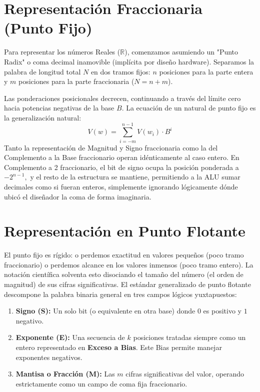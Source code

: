 \section{Representación Fraccionaria (Punto Fijo)}

Para representar los números Reales ($\mathbb{R}$), comenzamos asumiendo un "Punto Radix" o coma decimal inamovible (implícita por diseño hardware). 
Separamos la palabra de longitud total $N$ en dos tramos fijos: $n$ posiciones para la parte entera y $m$ posiciones para la parte fraccionaria ($N = n + m$).

Las ponderaciones posicionales decrecen, continuando a través del límite cero hacia potencias negativas de la base $B.$ 
La ecuación de un natural de punto fijo es la generalización natural:
\[ V(w) = \sum_{i=-m}^{n-1} V(w_i) \cdot B^i \]
Tanto la representación de Magnitud y Signo fraccionaria como la del Complemento a la Base fraccionario operan idénticamente al caso entero. En Complemento a 2 fraccionario, el bit de signo ocupa la posición ponderada a $-2^{n-1},$ y el resto de la estructura se mantiene, permitiendo a la ALU sumar decimales como si fueran enteros, simplemente ignorando lógicamente dónde ubicó el diseñador la coma de forma imaginaria.

\section{Representación en Punto Flotante}

El punto fijo es rígido: o perdemos exactitud en valores pequeños (poco tramo fraccionario) o perdemos alcance en los valores inmensos (poco tramo entero).
La notación científica solventa esto disociando el tamaño del número (el orden de magnitud) de sus cifras significativas. El estándar generalizado de punto flotante descompone la palabra binaria general en tres campos lógicos yuxtapuestos:
\begin{enumerate}
    \item \textbf{Signo (S):} Un solo bit (o equivalente en otra base) donde $0$ es positivo y $1$ negativo.
    \item \textbf{Exponente (E):} Una secuencia de $k$ posiciones tratadas siempre como un entero representado en \textbf{Exceso a Bias}. Este Bias permite manejar exponentes negativos.
    \item \textbf{Mantisa o Fracción (M):} Las $m$ cifras significativas del valor, operando estrictamente como un campo de coma fija fraccionario. 
\end{enumerate}

